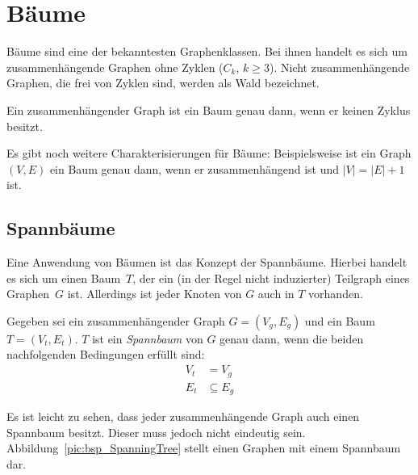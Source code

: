 \section{Bäume}
Bäume sind eine der bekanntesten Graphenklassen. Bei ihnen handelt es sich um zusammenhängende Graphen ohne Zyklen ($C_k$, $k\geq 3$). Nicht zusammenhängende Graphen, die frei von Zyklen sind, werden als Wald bezeichnet.

\begin{mydef}
    Ein zusammenhängender Graph ist ein Baum genau dann, wenn er keinen Zyklus besitzt.
\end{mydef}

Es gibt noch weitere Charakterisierungen für Bäume: Beispielsweise ist ein Graph $(V,E)$ ein Baum genau dann, wenn er zusammenhängend ist und $|V| = |E|+1$ ist.


\subsection{Spannbäume}
Eine Anwendung von Bäumen ist das Konzept der Spannbäume. Hierbei handelt es sich um einen Baum~$T$, der ein (in der Regel nicht induzierter) Teilgraph eines Graphen~$G$ ist. Allerdings ist jeder Knoten von $G$ auch in $T$ vorhanden.

\begin{mydef}
    Gegeben sei ein zusammenhängender Graph $G=(V_g,E_g)$ und ein Baum $T=(V_t,E_t)$. $T$ ist ein \emph{Spannbaum} von $G$ genau dann, wenn die beiden nachfolgenden Bedingungen erfüllt sind:
    \begin{align*}
       V_t &= V_g \\
       E_t &\subseteq E_g
    \end{align*}
\end{mydef}

Es ist leicht zu sehen, dass jeder zusammenhängende Graph auch einen Spannbaum besitzt. Dieser muss jedoch nicht eindeutig sein. Abbildung~\ref{pic:bsp_SpanningTree} stellt einen Graphen mit einem Spannbaum dar.

